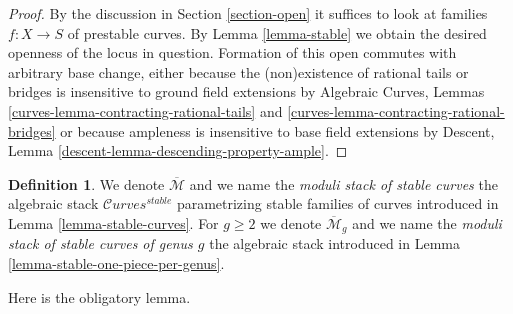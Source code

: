 \documentclass{stacks-project}
\newenvironment{reference}{\comment}{\endcomment}
\theoremstyle{plain}
\theoremstyle{definition}
\newtheorem{definition}[subsection]{Definition}
\theoremstyle{remark}
\numberwithin{equation}{subsection}
\def\Curvesstack{\mathcal{C}\!\mathit{urves}}
\begin{document}
\begin{proof}
By the discussion in Section \ref{section-open}
it suffices to look at families $f : X \to S$ of
prestable curves. By Lemma \ref{lemma-stable}
we obtain the desired openness of the locus in question.
Formation of this open commutes with arbitrary base change,
either because the (non)existence of rational tails or bridges
is insensitive to ground field extensions by
Algebraic Curves, Lemmas
\ref{curves-lemma-contracting-rational-tails} and
\ref{curves-lemma-contracting-rational-bridges}
or because ampleness is insensitive to base field extensions by
Descent, Lemma \ref{descent-lemma-descending-property-ample}.
\end{proof}

\begin{definition}
\label{definition-deligne-mumford}
\begin{reference}
\cite{DM}
\end{reference}
We denote $\overline{\mathcal{M}}$ and we name the
{\it moduli stack of stable curves} the algebraic stack
$\Curvesstack^{stable}$ parametrizing stable families of curves
introduced in Lemma \ref{lemma-stable-curves}.
For $g \geq 2$ we denote $\overline{\mathcal{M}}_g$ and we name the
{\it moduli stack of stable curves of genus $g$}
the algebraic stack introduced in Lemma \ref{lemma-stable-one-piece-per-genus}.
\end{definition}

\noindent
Here is the obligatory lemma.
\end{document}
